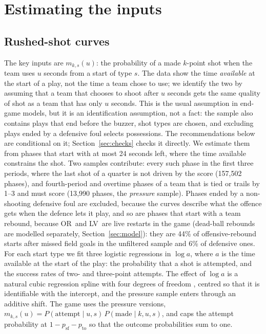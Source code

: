 \documentclass[article]{jdssv}
\newcommand{\LV}{\textsf{LV}}
\newcommand{\OR}{\textsf{OR}}
\begin{document}
\section{Estimating the inputs} \label{sec:estimation}

\subsection{Rushed-shot curves}

The key inputs are $m_{k,s}(u)$: the probability of a made $k$-point shot when the team uses $u$ seconds from
a start of type $s$. The data show the time \emph{available} at the start of a play, not the time a team chose
to use; we identify the two by assuming that a team that chooses to shoot after $u$ seconds gets the same
quality of shot as a team that has only $u$ seconds. This is the usual assumption in end-game models, but it
is an identification assumption, not a fact: the sample also contains plays that end before the buzzer, shot
types are chosen, and excluding plays ended by a defensive foul selects possessions. The recommendations below
are conditional on it; Section~\ref{sec:checks} checks it directly. We estimate them from phases that start with at most 24 seconds left, where the time
available constrains the shot. Two samples contribute: every such phase in the first three periods, where
the last shot of a quarter is not driven by the score (157{,}502 phases), and fourth-period and overtime
phases of a team that is tied or trails by 1--3 and must score (13{,}990 phases, the \emph{pressure} sample).
Phases ended by a non-shooting defensive foul are excluded, because the curves describe what the offence gets
when the defence lets it play, and so are phases that start with a team rebound, because \OR\ and \LV\ are live
restarts in the game (dead-ball rebounds are modelled separately, Section~\ref{sec:model}): they are 44\% of
offensive-rebound starts after missed field goals in the unfiltered sample and 6\% of defensive ones. For each start type we fit three logistic regressions in $\log a$, where $a$
is the time available at the start of the play: the probability that a shot is attempted, and the success
rates of two- and three-point attempts. The effect of $\log a$ is a natural cubic regression spline with four
degrees of freedom \citep{Wood2017}, centred so that it is identifiable with the intercept, and the pressure
sample enters through an additive shift. The game uses the pressure versions,
$m_{k,s}(u)=P(\text{attempt}\mid u,s)\,P(\text{made}\mid k,u,s)$, and caps the attempt probability at
$1-p_{\mathrm{sf}}-p_{\mathrm{to}}$ so that the outcome probabilities sum to one.
\end{document}

